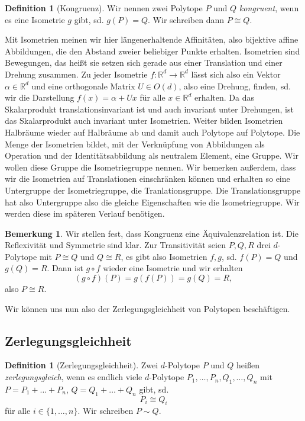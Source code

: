 \documentclass[11pt,titlepage]{article}
\newcommand{\setR}{\mathbb{R}}
\theoremstyle{definition}
\newtheorem{definition}[theorem]{Definition}
\newtheorem{remark}[theorem]{Bemerkung}
\theoremstyle{remark}
\begin{document}
	\begin{definition}[Kongruenz] \label{def:kong}
		Wir nennen zwei Polytope $P$ und $Q$ \textsl{kongruent}, wenn es eine Isometrie $g$ gibt, sd. 
		$g(P)=Q$. Wir schreiben dann $P\cong Q$.
	\end{definition}

	 Mit Isometrien meinen wir hier längenerhaltende Affinitäten, also bijektive affine Abbildungen, die den Abstand zweier beliebiger Punkte erhalten. 
	 Isometrien sind Bewegungen, das heißt sie setzen sich 
	 gerade aus einer Translation und einer Drehung zusammen. Zu jeder 
	 Isometrie $f:\setR^d\to\setR^d$ lässt sich also ein Vektor 
	 $\alpha\in\setR^d$ und eine orthogonale Matrix $U\in O(d)$, also 
	 eine Drehung, finden, sd. wir 
	 die Darstellung $f(x)=\alpha + Ux$ für alle $x\in \setR^d$ erhalten. 
	 Da das Skalarprodukt translationsinvariant ist und 
	 auch invariant unter Drehungen, ist das Skalarprodukt auch invariant 
	 unter Isometrien. Weiter bilden Isometrien Halbräume wieder auf 
	 Halbräume ab und damit auch Polytope auf Polytope. Die Menge 
	 der Isometrien bildet, mit der Verknüpfung von Abbildungen als 
	 Operation und der Identitätsabbildung als neutralem Element, eine Gruppe. 
	 Wir wollen 
	 diese Gruppe die Isometriegruppe nennen. Wir bemerken außerdem, dass 
	 wir die Isometrien auf Translationen einschränken können und erhalten 
	 so eine Untergruppe der Isometriegruppe, die Tranlationsgruppe. Die 
	 Translationsgruppe hat also Untergruppe also die gleiche Eigenschaften wie die 
	 Isometriegruppe. Wir werden diese im späteren Verlauf benötigen.

	\begin{remark}
		Wir stellen fest, dass Kongruenz eine Äquivalenzrelation ist. 
		Die Reflexivität und Symmetrie sind klar. Zur Transitivität seien 
		$P,Q,R$ drei $d$-Polytope mit $P\cong Q$ und $Q\cong R$, es gibt also 
		Isometrien $f,g$, sd. $f(P)=Q$ und $g(Q)=R$. Dann ist $g\circ f$ 
		wieder eine Isometrie und wir erhalten 
		\[(g\circ f)(P)=g(f(P))=g(Q)=R,\]
		also $P\cong R$. 
	\end{remark}
	
	Wir können uns nun also der Zerlegungsgleichheit von Polytopen beschäftigen.
	
	\subsection{Zerlegungsgleichheit}
	
	\begin{definition}[Zerlegungsgleichheit]
		Zwei $d$-Polytope $P$ und $Q$ heißen \textsl{zerlegungsgleich}, wenn es endlich viele $d$-Polytope 
		$P_1,\ldots,P_n,Q_1,\ldots,Q_n$ mit $P=P_1 +\ldots +P_n$,  $Q=Q_1 +\ldots+Q_n$ 
		gibt, sd. 
		\[P_i\cong Q_i\]
		für alle $i\in\{1,\ldots,n\}$. Wir schreiben $P\sim Q$.
	\end{definition}
	
\end{document}
